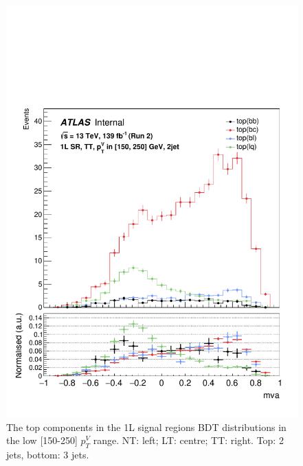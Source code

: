 \begin{figure}[h!]
\includegraphics[scale=0.253]{Images/VH/top/OneLepton_top_2tttag2jet_SR_150_250ptv_mva.pdf}
\caption{The top components in the 1L signal regions BDT distributions in the low [150-250] $p_T^V$ range. NT: left; LT: centre; TT: right. Top: 2 jets, bottom: 3 jets.} 
\label{fig:topSRslowptv}
\end{figure}


